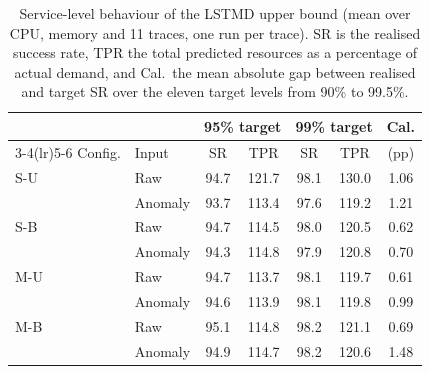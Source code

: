 \begin{table}[!t]\caption{Service-level behaviour of the LSTMD upper bound (mean over CPU, memory and 11 traces, one run per trace). SR is the realised success rate, TPR the total predicted resources as a percentage of actual demand, and Cal.\ the mean absolute gap between realised and target SR over the eleven target levels from 90\% to 99.5\%.}
\label{tab:lstmd_service}
\centering
\footnotesize
\setlength{\tabcolsep}{3.6pt}
\begin{tabular}{llccccc}
\toprule
 & & \multicolumn{2}{c}{95\% target} & \multicolumn{2}{c}{99\% target} & Cal.\\
\cmidrule(lr){3-4}\cmidrule(lr){5-6}
Config. & Input & SR & TPR & SR & TPR & (pp)\\
\midrule
S-U & Raw & 94.7 & 121.7 & 98.1 & 130.0 & 1.06\\
 & Anomaly & 93.7 & 113.4 & 97.6 & 119.2 & 1.21\\
\addlinespace[2pt]
S-B & Raw & 94.7 & 114.5 & 98.0 & 120.5 & 0.62\\
 & Anomaly & 94.3 & 114.8 & 97.9 & 120.8 & 0.70\\
\addlinespace[2pt]
M-U & Raw & 94.7 & 113.7 & 98.1 & 119.7 & 0.61\\
 & Anomaly & 94.6 & 113.9 & 98.1 & 119.8 & 0.99\\
\addlinespace[2pt]
M-B & Raw & 95.1 & 114.8 & 98.2 & 121.1 & 0.69\\
 & Anomaly & 94.9 & 114.7 & 98.2 & 120.6 & 1.48\\
\bottomrule
\end{tabular}
\end{table}

